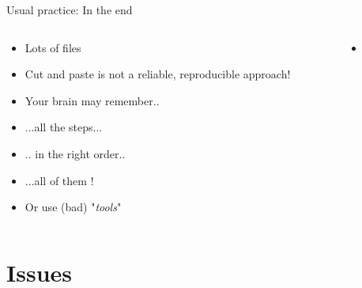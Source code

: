 \documentclass[xcolor=x11names,compress]{beamer}
\renewcommand{\(}{\begin{columns}}
\renewcommand{\)}{\end{columns}}
\newcommand{\<}[1]{\begin{column}{#1}}
\renewcommand{\>}{\end{column}}
\begin{document}
\begin{frame}{Usual practice: In the end}

 \begin{columns}[T]
    \begin{column}{0.5\textwidth}
      \begin{itemize}[<+->]
        \item Lots of files
        \item Cut and paste is not a reliable, reproducible approach!
        \item Your brain may remember..
        \item[] ...all the steps...
        \item[] .. in the right order..
        \item[]...all of them !
        \item Or use (bad) "\emph{tools}"
      \end{itemize}
    \end{column}
    \begin{column}{0.5\textwidth}
       \begin{itemize}
       \item[] 
    \end{itemize}
    \end{column}
  \end{columns}
\end{frame}

\section{Issues}
\end{document}

